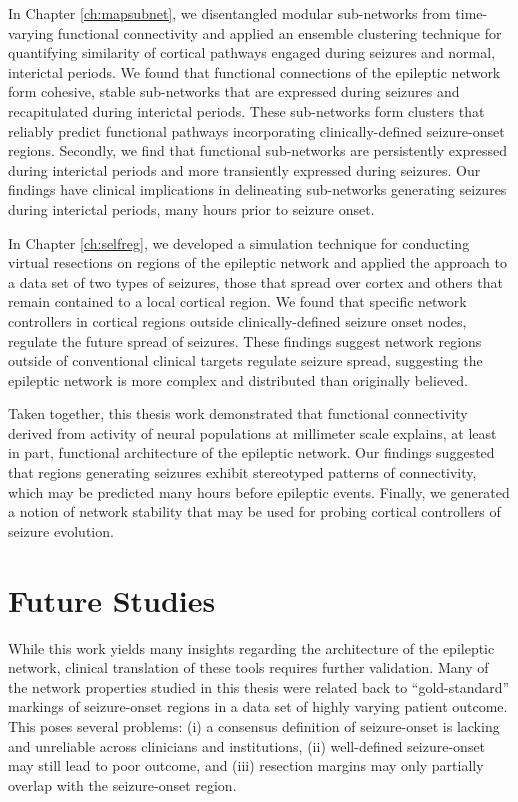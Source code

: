 In Chapter \ref{ch:mapsubnet}, we disentangled modular sub-networks from time-varying functional connectivity and applied an ensemble clustering technique for quantifying similarity of cortical pathways engaged during seizures and normal, interictal periods. We found that functional connections of the epileptic network form cohesive, stable sub-networks that are expressed during seizures and recapitulated during interictal periods. These sub-networks form clusters that reliably predict functional pathways incorporating clinically-defined seizure-onset regions. Secondly, we find that functional sub-networks are persistently expressed during interictal periods and more transiently expressed during seizures. Our findings have clinical implications in delineating sub-networks generating seizures during interictal periods, many hours prior to seizure onset.

In Chapter \ref{ch:selfreg}, we developed a simulation technique for conducting virtual resections on regions of the epileptic network and applied the approach to a data set of two types of seizures, those that spread over cortex and others that remain contained to a local cortical region. We found that specific network controllers in cortical regions outside clinically-defined seizure onset nodes, regulate the future spread of seizures. These findings suggest network regions outside of conventional clinical targets regulate seizure spread, suggesting the epileptic network is more complex and distributed than originally believed.

Taken together, this thesis work demonstrated that functional connectivity derived from activity of neural populations at millimeter scale explains, at least in part, functional architecture of the epileptic network. Our findings suggested that regions generating seizures exhibit stereotyped patterns of connectivity, which may be predicted many hours before epileptic events. Finally, we generated a notion of network stability that may be used for probing cortical controllers of seizure evolution.

\section{Future Studies}
While this work yields many insights regarding the architecture of the epileptic network, clinical translation of these tools requires further validation. Many of the network properties studied in this thesis were related back to ``gold-standard'' markings of seizure-onset regions in a data set of highly varying patient outcome. This poses several problems: (i) a consensus definition of seizure-onset is lacking and unreliable across clinicians and institutions, (ii) well-defined seizure-onset may still lead to poor outcome, and (iii) resection margins may only partially overlap with the seizure-onset region.

